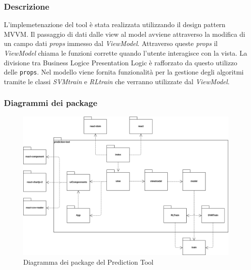\subsubsection{Descrizione}
L'implemetenazione del tool è stata realizzata utilizzando il design pattern MVVM.
Il passaggio di dati dalle view al model avviene attraverso la modifica di un campo dati \textit{props} immesso dal \textit{ViewModel}.
Attraverso queste \textit{props} il \textit{ViewModel} chiama le funzioni corrette quando l’utente interagisce con la vista.
La divisione tra Business Logic\glo e Presentation Logic è rafforzato da questo utilizzo delle \texttt{props}.
Nel modello viene fornita funzionalità per la gestione degli algoritmi tramite le classi \textit{SVMtrain} e \textit{RLtrain} che verranno utilizzate dal \textit{ViewModel}.

\subsubsection{Diagrammi dei package}
\begin{figure}[H]
\centering
\includegraphics[scale=0.45]{../../Diagrams/Package_diagrams/tool_design_patern.png}
\caption{Diagramma dei package del Prediction Tool}
\end{figure}

